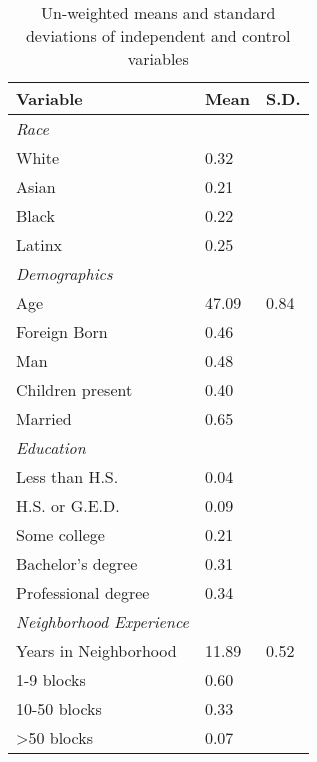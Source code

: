 % 
\begin{table}[ht]
\centering
\caption{Un-weighted means and standard deviations of independent and control variables} 
\label{tab:descriptives}
\begin{tabular}{lp{.5in}p{.5in}}
  \toprule
Variable & Mean & S.D. \\ 
  \midrule
\emph{Race}&&\\White &  0.32 &  \\ 
  Asian &  0.21 &  \\ 
  Black &  0.22 &  \\ 
  Latinx &  0.25 &  \\ 
  \emph{Demographics}&&\\Age & 47.09 & 0.84 \\ 
  Foreign Born &  0.46 &  \\ 
  Man &  0.48 &  \\ 
  Children present &  0.40 &  \\ 
  Married &  0.65 &  \\ 
  \emph{Education}&&\\Less than H.S. &  0.04 &  \\ 
  H.S. or G.E.D. &  0.09 &  \\ 
  Some college &  0.21 &  \\ 
  Bachelor's degree &  0.31 &  \\ 
  Professional degree &  0.34 &  \\ 
  \emph{Neighborhood Experience}\\Years in Neighborhood & 11.89 & 0.52 \\ 
  1-9 blocks &  0.60 &  \\ 
  10-50 blocks &  0.33 &  \\ 
  >50 blocks &  0.07 &  \\ 
   \bottomrule
\end{tabular}
\end{table}
